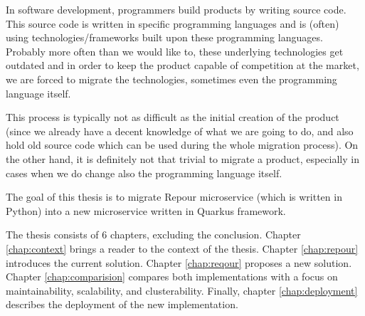 \documentclass[../../main.tex]{subfiles}
\begin{document}
In software development, programmers build products by writing source code. This source code is written in specific programming languages and is (often) using technologies/frameworks built upon these programming languages. Probably more often than we would like to, these underlying technologies get outdated and in order to keep the product capable of competition at the market, we are forced to migrate the technologies, sometimes even the programming language itself.

This process is typically not as difficult as the initial creation of the product (since we already have a decent knowledge of what we are going to do, and also hold old source code which can be used during the whole migration process). On the other hand, it is definitely not that trivial to migrate a product, especially in cases when we do change also the programming language itself.

The goal of this thesis is to migrate Repour microservice (which is written in Python) into a new microservice written in Quarkus framework.

The thesis consists of 6 chapters, excluding the conclusion. Chapter \ref{chap:context} brings a reader to the context of the thesis. Chapter \ref{chap:repour} introduces the current solution. Chapter \ref{chap:reqour} proposes a new solution. Chapter \ref{chap:comparision} compares both implementations with a focus on maintainability, scalability, and clusterability. Finally, chapter \ref{chap:deployment} describes the deployment of the new implementation.
\end{document}
